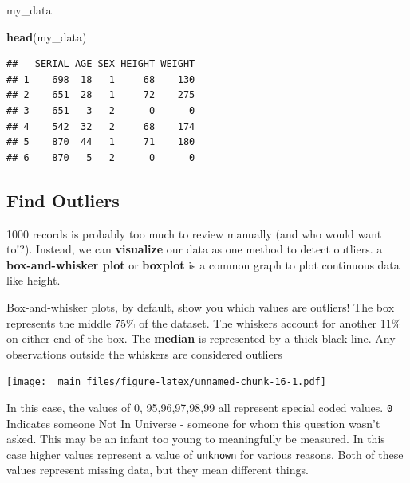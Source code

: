 \documentclass[
]{book}
\newenvironment{Shaded}{\begin{snugshade}}{\end{snugshade}}
\newcommand{\AttributeTok}[1]{\textcolor[rgb]{0.13,0.29,0.53}{#1}}
\newcommand{\FunctionTok}[1]{\textcolor[rgb]{0.13,0.29,0.53}{\textbf{#1}}}
\newcommand{\NormalTok}[1]{#1}
\newcommand{\SpecialCharTok}[1]{\textcolor[rgb]{0.81,0.36,0.00}{\textbf{#1}}}
\newcommand{\StringTok}[1]{\textcolor[rgb]{0.31,0.60,0.02}{#1}}
\begin{document}
\begin{Shaded}
\begin{Highlighting}[]
\NormalTok{my\_data}
\end{Highlighting}
\end{Shaded}

\begin{Shaded}
\begin{Highlighting}[]
\FunctionTok{head}\NormalTok{(my\_data)}
\end{Highlighting}
\end{Shaded}

\begin{verbatim}
##   SERIAL AGE SEX HEIGHT WEIGHT
## 1    698  18   1     68    130
## 2    651  28   1     72    275
## 3    651   3   2      0      0
## 4    542  32   2     68    174
## 5    870  44   1     71    180
## 6    870   5   2      0      0
\end{verbatim}

\hypertarget{find-outliers}{%
\subsection{Find Outliers}\label{find-outliers}}

1000 records is probably too much to review manually (and who would want to!?). Instead, we can \textbf{visualize} our data as one method to detect outliers. a \textbf{box-and-whisker plot} or \textbf{boxplot} is a common graph to plot continuous data like height.

Box-and-whisker plots, by default, show you which values are outliers! The box represents the middle 75\% of the dataset. The whiskers account for another 11\% on either end of the box. The \textbf{median} is represented by a thick black line. Any observations outside the whiskers are considered outliers

\begin{Shaded}
\end{Shaded}

\texttt{[image: \_main\_files/figure-latex/unnamed-chunk-16-1.pdf]}

In this case, the values of 0, 95,96,97,98,99 all represent special coded values. \texttt{0} Indicates someone Not In Universe - someone for whom this question wasn't asked. This may be an infant too young to meaningfully be measured. In this case higher values represent a value of \texttt{unknown} for various reasons. Both of these values represent missing data, but they mean different things.
\end{document}
